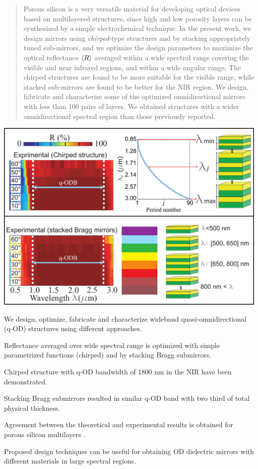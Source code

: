 \documentclass[a4paper,fleqn]{cas-sc}
\begin{document}
	\begin{abstract}
		Porous silicon is a very versatile material for developing optical
		devices based on multilayered structures, since high and low porosity layers
		can be synthesized by a simple electrochemical technique. In the present work, we design
		mirrors using \textit{chirped}-type structures and by stacking
		appropriately tuned sub-mirrors, and we optimize the design parameters
		to maximize the
		optical reflectance $\braket{R}$ averaged within a wide
		spectral range  covering the visible and near infrared regions, and
		within a wide angular range. The chirped structures are found to be
		more suitable for the visible range,
		while stacked sub-mirrors are found to be better for the NIR
		region. We design, fabricate and characterize
		some of the optimized omnidirectional mirrors with less
		than 100 pairs of layers. We obtained structures with a wider
		omnidirectional spectral region than those previously
		reported.
	\end{abstract}
	
	\begin{graphicalabstract}
		\includegraphics[width=\textwidth]{GraphicalAbstract.pdf}
	\end{graphicalabstract}
	
	\begin{highlights}
		\item We design, optimize, fabricate and characterize wideband quasi-omnidirectional (q-OD) structures using different approaches.
		\item Reflectance averaged over wide spectral range is optimized with simple parametrized functions (chirped) and by stacking Bragg submirrors.
		\item Chirped structure with q-OD bandwidth of 1800 nm in the NIR have been demonstrated.
		\item Stacking Bragg submirrors resulted in similar q-OD band with two third of total physical thickness.
		\item Agreement between the theoretical and experimental results is obtained for porous silicon multilayers .
		\item Proposed design techniques can be useful for obtaining OD dielectric mirrors with different materials in large spectral regions.
	\end{highlights}
	
\end{document}
